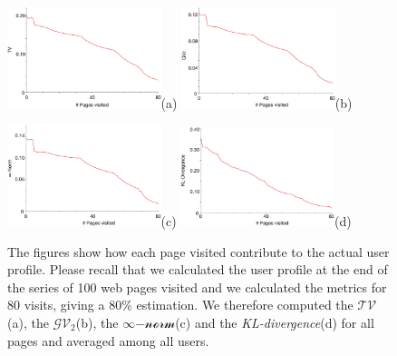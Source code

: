 \begin{figure}

{\includegraphics[width=0.4\textwidth]{figures/average_1_norm.eps}(a)
\includegraphics[width=0.4\textwidth]{figures/average_2_norm.eps}(b)}

{\includegraphics[width=0.4\textwidth]{figures/average_inf_norm.eps}(c)
\includegraphics[width=0.4\textwidth]{figures/average_kl.eps}(d)}

\caption[Page impact on the actual user's profile]{The figures show how each page visited contribute to the actual user profile. Please recall that we calculated the user profile at the end of the series of 100 web pages visited and we calculated the metrics for 80 visits, giving a 80\% estimation. %
We therefore computed the $\mathcal{TV}$(a), the $\mathcal{GV_2}$(b), the $\infty\mathcal{-norm}$(c) and the \emph{KL-divergence}(d) for all pages and averaged among all users.\label{fig:average-pop-profiles} }%
\end{figure}

